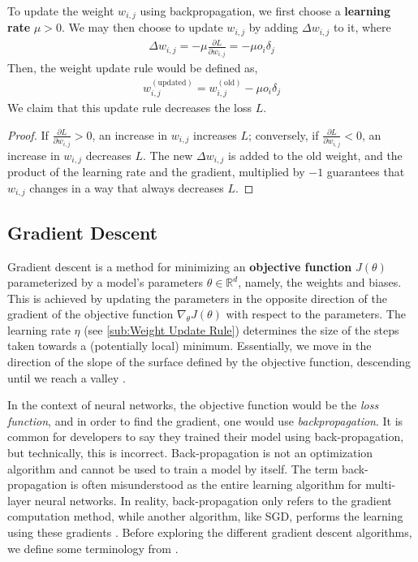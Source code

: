 \documentclass{article}
\begin{document}
  To update the weight $w_{i,j}$ using backpropagation, we first choose a \textbf{learning rate} $\mu> 0$. We may then choose to update $w_{i,j}$ by adding $\Delta w_{i,j}$ to it, where
  \begin{equation*}
    \begin{split}
      \Delta w_{i,j} = -\mu \frac{\partial {L}}{\partial {w_{i,j}}}  = - \mu  o_i \delta_j
    \end{split}
  \end{equation*}
 Then, the weight update rule would be defined as, 
 \begin{equation*}
  \begin{split}
    w_{i,j}^{(\text{updated})} =  w_{i,j}^{(\text{old})} - \mu  o_i \delta_j
  \end{split}
 \end{equation*}
 We claim that this update rule decreases the loss $L$. 
 \begin{proof} 
  
If ${\frac {\partial L}{\partial w_{i,j}}}>0$, an increase in $w_{i,j}$ increases $L$; conversely, if $\frac {\partial L}{\partial w_{i,j}}<0$, an increase in $w_{i,j}$ decreases $L$. The new $\Delta w_{i,j}$ is added to the old weight, and the product of the learning rate and the gradient, multiplied by $-1$ guarantees that $w_{i,j}$  changes in a way that always decreases $L$. 

 \end{proof}
\subsection{Gradient Descent}%
  \label{sub:Gradient Descent}
  
Gradient descent is a method for minimizing an \textbf{objective function} \( J(\theta) \) parameterized by a model's parameters \( \theta \in \mathbb{R}^d \), namely, the weights and biases. This is achieved by updating the parameters in the opposite direction of the gradient of the objective function \( \nabla_{\theta} J(\theta) \) with respect to the parameters. The learning rate \( \eta \) (see \autoref{sub:Weight Update Rule}) determines the size of the steps taken towards a (potentially local) minimum. Essentially, we move in the direction of the slope of the surface defined by the objective function, descending until we reach a valley \citep{ruder2017overview}. 

   In the context of neural networks, the objective function would be the \textit{loss function}, and in order to find the gradient, one would use \textit{backpropagation}. It is common for developers to say they trained their model using back-propagation, but technically, this is incorrect. Back-propagation is not an optimization algorithm and cannot be used to train a model by itself. The term back-propagation is often misunderstood as the entire learning algorithm for multi-layer neural networks. In reality, back-propagation only refers to the gradient computation method, while another algorithm, like SGD, performs the learning using these gradients \citep{Goodfellow-et-al-2016}. Before exploring the different gradient descent algorithms, we define some terminology from \cite{batchvsEpoch}. 
\end{document}
